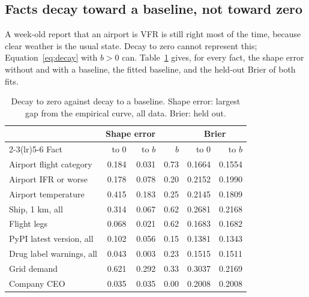 \subsection{Facts decay toward a baseline, not toward zero}\label{sec:results-baseline}

A week-old report that an airport is VFR is still right most of the time,
because clear weather is the usual state. Decay to zero cannot represent
this; Equation~\eqref{eq:decay} with $b > 0$ can. Table~\ref{tab:baseline}
gives, for every fact, the shape error without and with a baseline, the
fitted baseline, and the held-out Brier of both fits.

\begin{table}[t]
\centering
\small
\caption{Decay to zero against decay to a baseline. Shape error: largest
gap from the empirical curve, all data. Brier: held out.}
\label{tab:baseline}
\begin{tabular}{lrrrrr}
\toprule
 & \multicolumn{2}{c}{Shape error} & & \multicolumn{2}{c}{Brier} \\
\cmidrule(lr){2-3}\cmidrule(lr){5-6}
Fact & to 0 & to $b$ & $b$ & to 0 & to $b$ \\
\midrule
Airport flight category & 0.184 & 0.031 & 0.73 & 0.1664 & 0.1554 \\
Airport IFR or worse & 0.178 & 0.078 & 0.20 & 0.2152 & 0.1990 \\
Airport temperature & 0.415 & 0.183 & 0.25 & 0.2145 & 0.1809 \\
Ship, 1 km, all & 0.314 & 0.067 & 0.62 & 0.2681 & 0.2168 \\
Flight legs & 0.068 & 0.021 & 0.62 & 0.1683 & 0.1682 \\
PyPI latest version, all & 0.102 & 0.056 & 0.15 & 0.1381 & 0.1343 \\
Drug label warnings, all & 0.043 & 0.003 & 0.23 & 0.1515 & 0.1511 \\
Grid demand & 0.621 & 0.292 & 0.33 & 0.3037 & 0.2169 \\
Company CEO & 0.035 & 0.035 & 0.00 & 0.2008 & 0.2008 \\
\bottomrule
\end{tabular}
\end{table}

